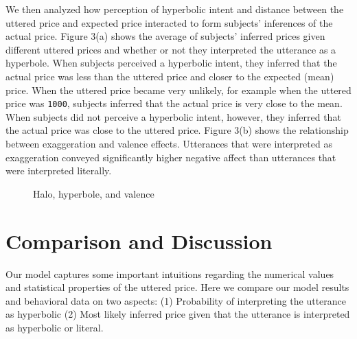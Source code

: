\documentclass{article} %
\begin{document}
We then analyzed how perception of hyperbolic intent and distance between the uttered price and expected price interacted to form subjects' inferences of the actual price. Figure 3(a) shows the average of subjects' inferred prices given different uttered prices and whether or not they interpreted the utterance as a hyperbole. When subjects perceived a hyperbolic intent, they inferred that the actual price was less than the uttered price and closer to the expected (mean) price. When the uttered price became very unlikely, for example when the uttered price was \texttt{1000}, subjects inferred that the actual price is very close to the mean. When subjects did not perceive a hyperbolic intent, however, they inferred that the actual price was close to the uttered price. Figure 3(b) shows the relationship between exaggeration and valence effects. Utterances that were interpreted as exaggeration conveyed significantly higher negative affect than utterances that were interpreted literally. 


\begin{figure}[t]
\caption{Halo, hyperbole, and valence}
\end{figure}


\section{Comparison and Discussion}
Our model captures some important intuitions regarding the numerical values and statistical properties of the uttered price. Here we compare our model results and behavioral data on two aspects: (1) Probability of interpreting the utterance as hyperbolic (2) Most likely inferred price given that the utterance is interpreted as hyperbolic or literal.
\end{document}

